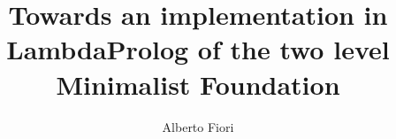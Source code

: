 \usepackage{ebproof}%

\author{Alberto Fiori}
\title{Towards an implementation in LambdaProlog of the two level Minimalist Foundation}






\newcommand{\noop}[1]{}
\newcommand{\s}[1]{\noop\textsf{\text{\ensuremath{\mathsf{#1}}}}}
\newcommand{\type}{\s{type}}






